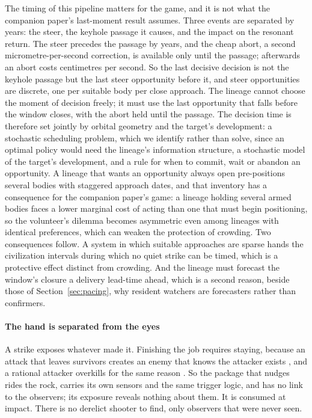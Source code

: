 \documentclass[preprint,12pt]{elsarticle}
\theoremstyle{definition}
\begin{document}
The timing of this pipeline matters for the game, and it is not what the companion paper's last-moment result assumes. Three events are separated by years: the steer, the keyhole passage it causes, and the impact on the resonant return. The steer precedes the passage by years, and the cheap abort, a second micrometre-per-second correction, is available only until the passage; afterwards an abort costs centimetres per second. So the last decisive decision is not the keyhole passage but the last steer opportunity before it, and steer opportunities are discrete, one per suitable body per close approach. The lineage cannot choose the moment of decision freely; it must use the last opportunity that falls before the window closes, with the abort held until the passage. The decision time is therefore set jointly by orbital geometry and the target's development: a stochastic scheduling problem, which we identify rather than solve, since an optimal policy would need the lineage's information structure, a stochastic model of the target's development, and a rule for when to commit, wait or abandon an opportunity. A lineage that wants an opportunity always open pre-positions several bodies with staggered approach dates, and that inventory has a consequence for the companion paper's game: a lineage holding several armed bodies faces a lower marginal cost of acting than one that must begin positioning, so the volunteer's dilemma becomes asymmetric even among lineages with identical preferences, which can weaken the protection of crowding. Two consequences follow. A system in which suitable approaches are sparse hands the civilization intervals during which no quiet strike can be timed, which is a protective effect distinct from crowding. And the lineage must forecast the window's closure a delivery lead-time ahead, which is a second reason, beside those of Section~\ref{sec:pacing}, why resident watchers are forecasters rather than confirmers.

\paragraph{The hand is separated from the eyes} A strike exposes whatever made it. Finishing the job requires staying, because an attack that leaves survivors creates an enemy that knows the attacker exists \citep{Korhonen2013}, and a rational attacker overkills for the same reason \citep{JebariAsker2024}. So the package that nudges rides the rock, carries its own sensors and the same trigger logic, and has no link to the observers; its exposure reveals nothing about them. It is consumed at impact. There is no derelict shooter to find, only observers that were never seen.
\end{document}
